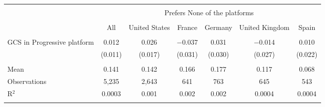 
\begin{tabular}{@{\extracolsep{5pt}}lcccccc} 
\\[-1.8ex]\hline 
\hline \\[-1.8ex] 
 & \multicolumn{6}{c}{Prefers None of the platforms} \\ 
\cline{2-7} 
\\[-1.8ex] & All & United States & France & Germany & United Kingdom & Spain \\ 
\hline \\[-1.8ex] 
 GCS in Progressive platform & 0.012 & 0.026 & $-$0.037 & 0.031 & $-$0.014 & 0.010 \\ 
  & (0.011) & (0.017) & (0.031) & (0.030) & (0.027) & (0.022) \\ 
 \hline \\[-1.8ex] 
Mean & 0.141 & 0.142 & 0.166 & 0.177 & 0.117 & 0.068 \\ 
Observations & 5,235 & 2,643 & 641 & 763 & 645 & 543 \\ 
R$^{2}$ & 0.0003 & 0.001 & 0.002 & 0.002 & 0.0004 & 0.0004 \\ 
\hline 
\hline \\[-1.8ex] 
\end{tabular} 